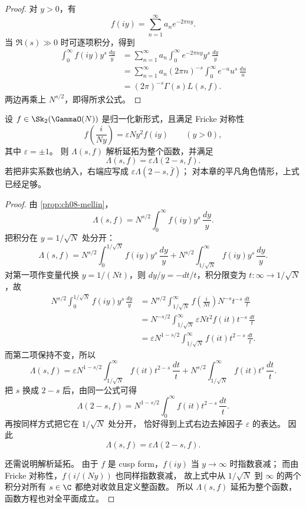 \begin{proof}
对 $y>0$，有
\[
  f(iy)=\sum_{n=1}^{\infty}a_ne^{-2\pi ny}.
\]
当 $\Re(s)\gg0$ 时可逐项积分，得到
\begin{align*}
  \int_0^{\infty} f(iy)y^s\,\frac{dy}{y}
  &=\sum_{n=1}^{\infty}a_n\int_0^{\infty}e^{-2\pi ny}y^s\,\frac{dy}{y}\\
  &=\sum_{n=1}^{\infty}a_n(2\pi n)^{-s}\int_0^{\infty}e^{-u}u^s\,\frac{du}{u}\\
  &=(2\pi)^{-s}\Gamma(s)L(s,f).
\end{align*}
两边再乘上 $N^{s/2}$，即得所求公式。
\end{proof}

\begin{theorem}
\label{thm:ch08-functional-equation}
设 $f\in \Sk_2(\GammaO(N))$ 是归一化新形式，且满足 Fricke 对称性
\[
  f\!\left(\frac{i}{Ny}\right)=\varepsilon Ny^2 f(iy)
  \qquad (y>0),
\]
其中 $\varepsilon=\pm1$。
则 $\Lambda(s,f)$ 解析延拓为整个函数，并满足
\[
  \Lambda(s,f)=\varepsilon\Lambda(2-s,f).
\]
若把非实系数也纳入，右端应写成 $\varepsilon\Lambda(2-s,\bar f)$；
对本章的平凡角色情形，上式已经足够。
\end{theorem}

\begin{proof}
由 \cref{prop:ch08-mellin}，
\[
  \Lambda(s,f)=N^{s/2}\int_0^{\infty}f(iy)y^s\,\frac{dy}{y}.
\]
把积分在 $y=1/\sqrt N$ 处分开：
\[
  \Lambda(s,f)=N^{s/2}\int_0^{1/\sqrt N}f(iy)y^s\,\frac{dy}{y}
  +N^{s/2}\int_{1/\sqrt N}^{\infty}f(iy)y^s\,\frac{dy}{y}.
\]
对第一项作变量代换 $y=1/(Nt)$，则 $dy/y=-dt/t$，积分限变为
$t:\infty\to 1/\sqrt N$，故
\begin{align*}
  N^{s/2}\int_0^{1/\sqrt N}f(iy)y^s\,\frac{dy}{y}
  &=N^{s/2}\int_{1/\sqrt N}^{\infty}f\!\left(\frac{i}{Nt}\right)N^{-s}t^{-s}\,\frac{dt}{t}\\
  &=N^{-s/2}\int_{1/\sqrt N}^{\infty}\varepsilon Nt^2f(it)t^{-s}\,\frac{dt}{t}\\
  &=\varepsilon N^{1-s/2}\int_{1/\sqrt N}^{\infty}f(it)t^{2-s}\,\frac{dt}{t}.
\end{align*}
而第二项保持不变，所以
\[
  \Lambda(s,f)=\varepsilon N^{1-s/2}\int_{1/\sqrt N}^{\infty}f(it)t^{2-s}\,\frac{dt}{t}
  +N^{s/2}\int_{1/\sqrt N}^{\infty}f(it)t^s\,\frac{dt}{t}.
\]
把 $s$ 换成 $2-s$ 后，由同一公式可得
\[
  \Lambda(2-s,f)=N^{1-s/2}\int_0^{\infty}f(it)t^{2-s}\,\frac{dt}{t}.
\]
再按同样方式把它在 $1/\sqrt N$ 处分开，
恰好得到上式右边去掉因子 $\varepsilon$ 的表达。
因此
\[
  \Lambda(s,f)=\varepsilon\Lambda(2-s,f).
\]

还需说明解析延拓。
由于 $f$ 是 cusp form，$f(iy)$ 当 $y\to\infty$ 时指数衰减；
而由 Fricke 对称性，$f(i/(Ny))$ 也同样指数衰减，
故上式中从 $1/\sqrt N$ 到 $\infty$ 的两个积分对所有 $s\in\C$ 都绝对收敛且定义整函数。
所以 $\Lambda(s,f)$ 延拓为整个函数，函数方程也对全平面成立。
\end{proof}

